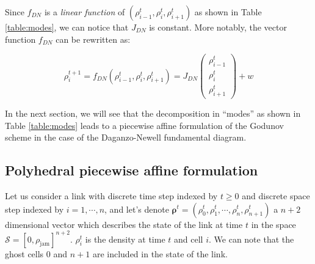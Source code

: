 Since $f_{DN}$ is a \textit{linear function} of $(\rho^{t}_{i-1},\rho^{t}_{i},\rho^{t}_{i+1})$ as shown in Table \ref{table:modes}, we can notice that $J_{DN}$ is constant. More notably, the vector function $f_{DN}$ can be rewritten as:

\begin{equation}
\rho^{t+1}_{i} = f_{DN}(\rho^{t}_{i-1},\rho^{t}_{i},\rho^{t}_{i+1}) = J_{DN}\left( \begin{array}{c}
\rho^{t}_{i-1}\\
\rho^{t}_{i}\\
\rho^{t}_{i+1}
\end{array} \right)
+ w
\label{eq:fDN}
\end{equation}

In the next section, we will see that the decomposition in ``modes'' as shown in Table \ref{table:modes} leads to a piecewise affine formulation of the Godunov scheme in the case of the Daganzo-Newell fundamental diagram.


\subsection{Polyhedral piecewise affine formulation}\label{sec:formulation}

Let us consider a link with discrete time step indexed by $t\geq 0$ and discrete space step indexed by $i = 1,\cdots,n$, and let's denote $\boldsymbol\rho^{t} = (\rho^{t}_{0},\rho^{t}_{1},\cdots,\rho^{t}_{n},\rho^{t}_{n+1})$ a $n+2$ dimensional vector which describes the state of the link at time $t$ in the space $\mathcal{S} = [0,\rho_{\text{jam}}]^{n+2}$. $\rho^{t}_{i}$ is the density at time $t$ and cell $i$. We can note that the ghost cells $0$ and $n+1$ are included in the state of the link\footnotemark.


\hspace{10mm}

